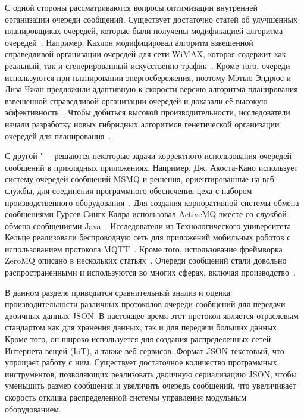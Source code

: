 С одной стороны рассматриваются вопросы оптимизации внутренней организации очереди сообщений. Существует достаточно статей об улучшенных планировщиках очередей, которые были получены модификацией алгоритма очередей~\cite{Valente201416, Rizzo201534}. Например, Кахлон модифицировал алгоритм взвешенной справедливой организации очередей для сети WiMAX, которая содержит как реальный, так и сгенерированный искусственно трафик~\cite{Kahlon2016357}. Кроме того, очереди используются при планировании энергосбережения, поэтому Мэтью Эндрюс и Лиза Чжан предложили адаптивную к скорости версию алгоритма планирования взвешенной справедливой организации очередей и доказали её высокую эффективность~\cite{Andrews2014247}. Чтобы добиться высокой производительности, исследователи начали разработку новых гибридных алгоритмов генетической организации очередей для планирования~\cite{Rashidi2017331, Kahlon2016357}.

С другой "--- решаются некоторые задачи корректного использования очередей сообщений в прикладных приложениях. Например, Дж. Акоста-Кано использует систему очередей сообщений MSMQ и решения, ориентированные на веб-службы, для соединения программного обеспечения цеха с набором производственного оборудования~\cite{AcostaCano2013447}. Для создания корпоративной системы обмена сообщениями Гурсев Сингх Калра использовал ActiveMQ вместе со службой обмена сообщениями Java~\cite{Kalra20147}. Исследователи из Технологического университета Кельце реализовали беспроводную сеть для приложений мобильных роботов с использованием протокола MQTT~\cite{KAZALA2015231}. Кроме того, использование фреймворка ZeroMQ описано в нескольких статьях~\cite{KIRILL2015278, GOERTZEL2014158, ANDREEV201533}. Очереди сообщений стали довольно распространенными и используются во многих сферах, включая производство~\cite{STOCK2014320, MORARIU20121850}.

В данном разделе приводится сравнительный анализ и оценка производительности различных протоколов очереди сообщений для передачи двоичных данных JSON. В настоящее время этот протокол является отраслевым стандартом как для хранения данных, так и для передачи больших данных. Кроме того, он широко используется для создания распределенных сетей Интернета вещей (IoT), а также веб-сервисов. Формат JSON текстовый, что упрощает работу с ним. Существует достаточное количество программных инструментов, позволяющих реализовать двоичную сериализацию JSON, чтобы уменьшить размер сообщения и увеличить очередь сообщений, что увеличивает скорость отклика распределенной системы управления модульным оборудованием.

